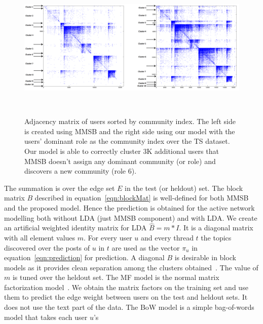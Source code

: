 \documentclass{sig-alternate}
\begin{document}
\begin{figure}
\begin{center}
\includegraphics[height=7cm,width=18cm]{SimilarityMatTSAnnotated.png}
\end{center}
\vspace*{-2\baselineskip}
\caption{Adjacency matrix of users sorted by community index. The left side is 
created using MMSB and the right side using our model with the 
users' dominant role as the community index over the TS dataset. 
Our model is able to correctly cluster 3K
additional users that MMSB doesn't assign any dominant community (or role) and
discovers a new community (role 6).}
\label{fig:similarityMatTS}
\vspace*{-1\baselineskip}
\end{figure}
The summation is over the edge set $E$ in the test (or heldout) set. The block matrix
$B$ described in equation~\ref{eqn:blockMat} is well-defined for both MMSB and
the proposed model. Hence the prediction is obtained for the active network modelling 
both without
LDA (just MMSB component) and with LDA. We create an artificial
weighted identity matrix for LDA $\hat{B}=m*I$. It is a diagonal matrix with
all element values $m$. For every user $u$ and every thread $t$ the topics discovered over the
posts of $u$ in $t$ are used as the vector $\pi_u$ in
equation~\ref{eqn:prediction} for prediction. A diagonal $B$ is desirable in
block models as it provides clean separation among the clusters
obtained~\cite{Airoldi:2008:MMS:1390681.1442798}.
The value of $m$ is tuned over the heldout set. 
The MF model is the normal matrix factorization model~\cite{Gemulla:2011:LMF}. 
We obtain the 
matrix factors on the training set and use them to predict the edge weight between
users on the test and heldout sets. It does not use the text part of the data.
The BoW model is a simple bag-of-words model that takes each user $u$'s
\end{document}
